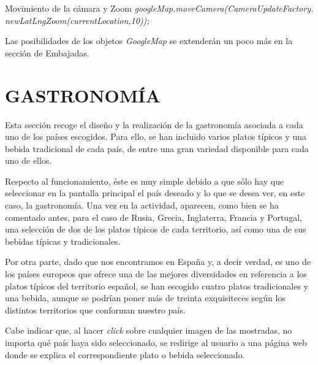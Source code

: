 \documentclass[letterpaper,twocolumn,openany,nodeprecatedcode,dvipsnames,nomultitoc]{dndbook}
\begin{document}
\begin{justify}
\begingroup
\DndSetThemeColor[PhbMauve]
\begin{DndSidebar}{Movimiento de la cámara y Zoom}
  \textit{googleMap.moveCamera(CameraUpdateFactory. newLatLngZoom(currentLocation,10));}
\end{DndSidebar}
\endgroup
Las posibilidades de los objetos \textit{GoogleMap} se extenderán un poco más en la sección de Embajadas.


\section{GASTRONOMÍA}
\vspace{5pt}

\par 
Esta sección recoge el diseño y la realización de la gastronomía asociada a cada uno de los países escogidos. Para ello, se han incluido varios platos típicos y una bebida tradicional de cada país, de entre una gran variedad disponible para cada uno de ellos.

\vspace{5pt}

\par 
Respecto al funcionamiento, éste es muy simple debido a que sólo hay que seleccionar en la pantalla principal el país deseado y lo que se desea ver, en este caso, la gastronomía. Una vez en la actividad, aparecen, como bien se ha comentado antes, para el caso de Rusia, Grecia, Inglaterra, Francia y Portugal, una selección de dos de los platos típicos de cada territorio, así como una de sus bebidas típicas y tradicionales. 

\vspace{5pt}

\par 
Por otra parte, dado que nos encontramos en España y, a decir verdad, es uno de los países europeos que ofrece una de las mejores diversidades en referencia a los platos típicos del territorio español, se han escogido cuatro platos tradicionales y una bebida, aunque se podrían poner más de treinta exquisiteces según los distintos territorios que conforman nuestro país.

\vspace{5pt}

\par 
Cabe indicar que, al hacer \textit{click} sobre cualquier imagen de las mostradas, no importa qué país haya sido seleccionado, se redirige al usuario a una página web donde se explica el correspondiente plato o bebida seleccionado.


\end{justify}
\end{document}
